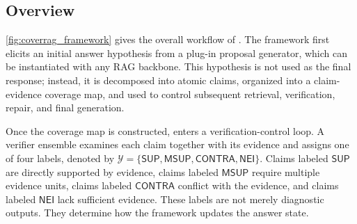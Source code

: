 \subsection{Overview}
\label{subsec:framework_overview}

\autoref{fig:coverrag_framework} gives the overall workflow of \ragname. 
The framework first elicits an initial answer hypothesis from a plug-in proposal generator, which can be instantiated with any RAG backbone. This hypothesis is not used as the final response; instead, it is decomposed into atomic claims, organized into a claim-evidence coverage map, and used to control subsequent retrieval, verification, repair, and final generation.

Once the coverage map is constructed, \ragname enters a verification-control loop. A verifier ensemble examines each claim together with its evidence and assigns one of four labels, denoted by $\mathcal{Y}=\{\mathsf{SUP},\mathsf{MSUP},\mathsf{CONTRA},\mathsf{NEI}\}$. Claims labeled $\mathsf{SUP}$ are directly supported by evidence, claims labeled $\mathsf{MSUP}$ require multiple evidence units, claims labeled $\mathsf{CONTRA}$ conflict with the evidence, and claims labeled $\mathsf{NEI}$ lack sufficient evidence. These labels are not merely diagnostic outputs. They determine how the framework updates the answer state.

